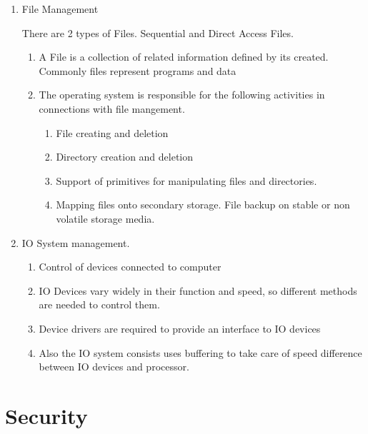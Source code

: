 \documentclass[11pt]{article}
\begin{document}
\begin{enumerate}
\begin{enumerate}
	      \end{enumerate}
	\item File Management

	      There are 2 types of Files. Sequential and Direct Access Files.

	      \begin{enumerate}
		      \item A File is a collection of related information defined by its created. Commonly files represent programs and data
		      \item The operating system is responsible for the following activities in connections with file mangement.
		            \begin{enumerate}
			            \item File creating and deletion
			            \item Directory creation and deletion
			            \item Support of primitives for manipulating files and directories.
			            \item Mapping files onto secondary storage. File backup on stable or non volatile storage media.
		            \end{enumerate}

	      \end{enumerate}

	\item IO System management.

	      \begin{enumerate}
		      \item Control of devices connected to computer
		      \item IO Devices vary widely in their function and speed, so different methods are needed to control them.
		      \item Device drivers are required to provide an interface to IO devices
		      \item Also the IO system consists uses buffering to take care of speed difference between IO devices and processor.
	      \end{enumerate}

\end{enumerate}

\section{Security}
\end{document}
